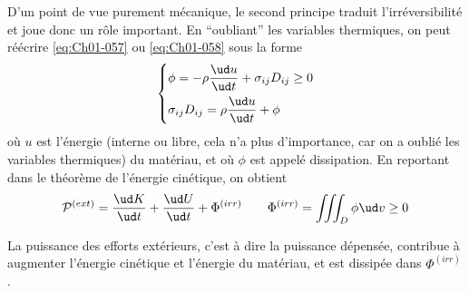 D'un point de vue purement mécanique, le second principe traduit l'irréversibilité et joue donc un rôle important.
En ``oubliant'' les variables thermiques, on peut réécrire \eqref{eq:Ch01-057} ou \eqref{eq:Ch01-058} sous la forme
\begin{equation}
    \left\{
    \begin{aligned}
        & \phi = -\rho \frac{\ud u}{\ud t} + \sigma_{ij} D_{ij} \geq 0\\
        & \sigma_{ij} D_{ij} = \rho \frac{\ud u}{\ud t} + \phi
    \end{aligned}
    \right.
    \label{eq:Ch01-059}
\end{equation}
où $u$ est l'énergie (interne ou libre, cela n'a plus d'importance, car on a oublié les variables thermiques) du matériau, et où $\phi$ est appelé dissipation.
En reportant dans le théorème de l'énergie cinétique, on obtient 
\begin{equation}
    \mathcal{P}^{(ext)} = \frac{\ud K}{\ud t} + \frac{\ud U}{\ud t} + \Phi^{(irr)} \qquad \Phi^{(irr)} = \iiint_{D} \phi \ud v \geq 0
    \label{eq:Ch01-060}
\end{equation}

La puissance des efforts extérieurs, c'est à dire la puissance dépensée, contribue à augmenter l'énergie cinétique et l'énergie du matériau, et est dissipée dans $\Phi^{(irr)}$.

